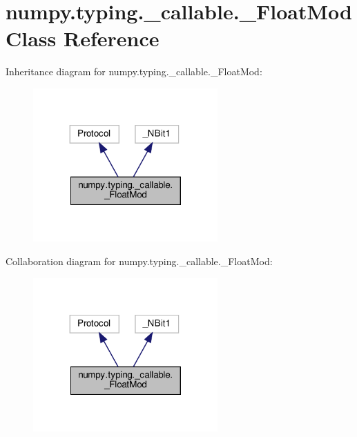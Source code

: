 \hypertarget{classnumpy_1_1typing_1_1__callable_1_1__FloatMod}{}\section{numpy.\+typing.\+\_\+callable.\+\_\+\+Float\+Mod Class Reference}
\label{classnumpy_1_1typing_1_1__callable_1_1__FloatMod}


Inheritance diagram for numpy.\+typing.\+\_\+callable.\+\_\+\+Float\+Mod\+:
\nopagebreak
\begin{figure}[H]
\begin{center}
\leavevmode
\includegraphics[width=200pt]{classnumpy_1_1typing_1_1__callable_1_1__FloatMod__inherit__graph}
\end{center}
\end{figure}


Collaboration diagram for numpy.\+typing.\+\_\+callable.\+\_\+\+Float\+Mod\+:
\nopagebreak
\begin{figure}[H]
\begin{center}
\leavevmode
\includegraphics[width=200pt]{classnumpy_1_1typing_1_1__callable_1_1__FloatMod__coll__graph}
\end{center}
\end{figure}
